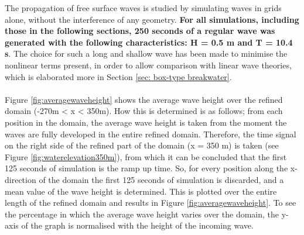 The propagation of free surface waves is studied by simulating waves in grids alone, without the interference of any geometry. \textbf{For all simulations, including those in the following sections, 250 seconds of a regular wave was generated with the following characteristics: H = 0.5 m and T = 10.4 s}. The choice for such a long and shallow wave has been made to minimise the nonlinear terms present, in order to allow comparison with linear wave theories, which is elaborated more in Section \ref{sec: box-type breakwater}.\\
\\
Figure \ref{fig:averagewaveheight} shows the average wave height over the refined domain (-270m < x < 350m).  How this is determined is as follows; from each position in the domain, the average wave height is taken from the moment the waves are fully developed in the entire refined domain. Therefore, the time signal on the right side of the refined part of the domain (x = 350 m) is taken (see Figure \ref{fig:waterelevation350m}), from which it can be concluded that the first 125 seconds of simulation is the ramp up time. So, for every position along the x-direction of the domain the first 125 seconds of simulation is discarded, and a mean value of the wave height is determined. This is plotted over the entire length of the refined domain and results in Figure \ref{fig:averagewaveheight}. To see the percentage in which the average wave height varies over the domain, the y-axis of the graph is normalised with the height of the incoming wave.  


